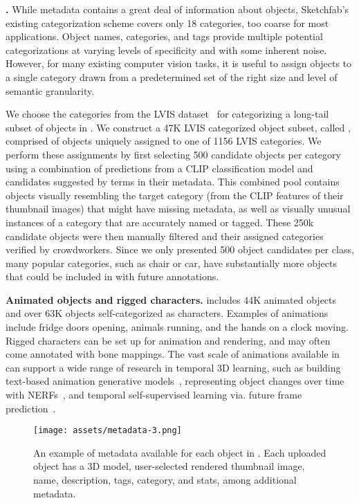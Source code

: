 \textbf{\datalvis.}
While \data metadata contains a great deal of information about objects, Sketchfab's existing categorization scheme covers only 18 categories, too coarse for most applications. Object names, categories, and tags provide multiple potential categorizations at varying levels of specificity and with some inherent noise. However, for many existing computer vision tasks, it is useful to assign objects to a single category drawn from a predetermined set of the right size and level of semantic granularity.

We choose the categories from the LVIS dataset~\cite{gupta2019lvis} for categorizing a long-tail subset of objects in \data. We construct a 47K LVIS categorized object subset, called \datalvis, comprised of objects uniquely assigned to one of 1156 LVIS categories. We perform these assignments by first selecting 500 candidate objects per category using a combination of predictions from a CLIP classification model and candidates suggested by terms in their metadata. This combined pool contains objects visually resembling the target category (from the CLIP features of their thumbnail images) that might have missing metadata, as well as visually unusual instances of a category that are accurately named or tagged. These 250k candidate objects were then manually filtered and their assigned categories verified by crowdworkers. Since we only presented 500 object candidates per class, many popular categories, such as chair or car, have substantially more objects that could be included in \datalvis with future annotations.

\textbf{Animated objects and rigged characters.} \data includes 44K animated objects and over 63K objects self-categorized as characters. Examples of animations include fridge doors opening, animals running, and the hands on a clock moving. Rigged characters can be set up for animation and rendering, and may often come annotated with bone mappings. The vast scale of animations available in \data can support a wide range of research in temporal 3D learning, such as building text-based animation generative models~\cite{tevet2022human}, representing object changes over time with NERFs~\cite{pumarola2021d,park2021nerfies}, and temporal self-supervised learning via. future frame prediction~\cite{zellers2022merlot,jabri2020space}.

\begin{figure*}[t!]
    \centering
    \texttt{[image: assets/metadata-3.png]}
    \caption{An example of metadata available for each object in \data. Each uploaded object has a 3D model, user-selected rendered thumbnail image, name, description, tags, category, and stats, among additional metadata.}
    \label{fig:sf-metadata}
    \vspace{-1em}
\end{figure*}

